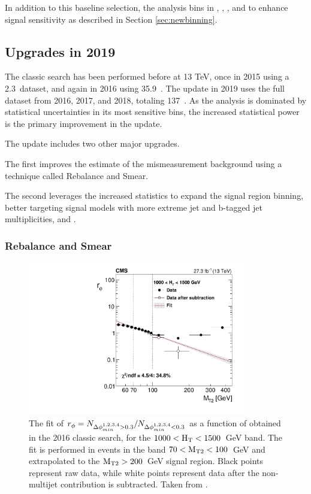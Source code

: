   In addition to this baseline selection, the analysis bins in \mttwo, \Ht, \njet, and \nb to enhance signal sensitivity as described in Section \ref{sec:newbinning}.

  \subsection{Upgrades in 2019} \label{sec:MT2upgrades}

  The classic search has been performed before at 13 TeV, once in 2015 \cite{MT2_2015} using a 2.3~\fbinv dataset, and again in 2016 \cite{MT2_2016} using 35.9~\fbinv.
  The update in 2019 uses the full dataset from 2016, 2017, and 2018, totaling 137~\fbinv.
  As the analysis is dominated by statistical uncertainties in its most sensitive bins, the increased statistical power is the primary improvement in the update.
  
  The update includes two other major upgrades.

  The first improves the estimate of the mismeasurement background using a technique called Rebalance and Smear.

  The second leverages the increased statistics to expand the signal region binning, better targeting signal models with more extreme jet and b-tagged jet multiplicities, and \mttwo.
  

    \subsubsection{Rebalance and Smear} \label{sec:RandS}

    \begin{figure}[h!]
      \centering
      \includegraphics[width=0.85\textwidth]{figures/mt2_rphi_2016.pdf}
      \caption[Fit of $r_{\phi}$ as a function of \mttwo.]{
        The fit of $r_{\phi} = N_{\Delta\phi_{min}^{1,2,3,4} > 0.3}/N_{\Delta\phi_{min}^{1,2,3,4} < 0.3}$ as a function of \mttwo obtained in the 2016 classic search, for the $1000 < \mathrm{H_{T}} < 1500$~GeV \Ht band. 
        The fit is performed in events in the \mttwo band $70 < \mathrm{M_{T2}} < 100$~GeV and extrapolated to the $\mathrm{M_{T2}} > 200$~GeV signal region.
        Black points represent raw data, while white points represent data after the non-multijet contribution is subtracted.
        Taken from \cite{MT2_2016}.}
      \label{fig:rphi}
    \end{figure}  

